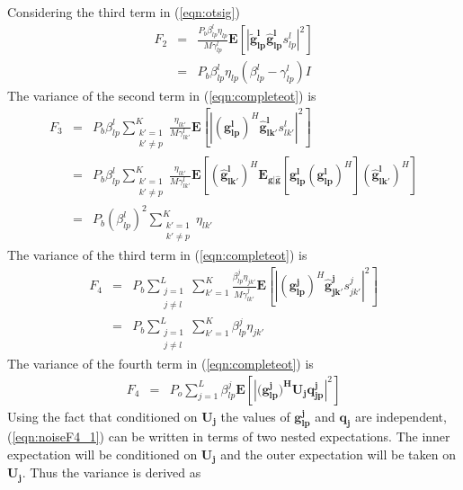 \documentclass[10pt, a4paper, twoside,fleqn]{article}
\begin{document}
Considering the third term in (\ref{eqn:otsig}) 
\begin{eqnarray}\label{eq:noiseF2}
	F_2 &=& \frac{P_b\beta_{lp}^{l}\eta_{lp}}{M\gamma_{lp}^{l}} \mathbf{E}[| \mathbf{\widetilde{g}_{lp}^{l}} \mathbf{\hat g_{lp}^{l}} s_{lp}^{l}|^2] \nonumber \\
	    &=&  P_b\beta_{lp}^{l}\eta_{lp} (\beta_{lp}^{l} - \gamma_{lp}^{l})I 
\end{eqnarray}
The variance of the second term in (\ref{eqn:completeot}) is
\begin{eqnarray}\label{eq:noiseF3}
	F_3 &=& P_b\beta_{lp}^{l}\sum_{\substack{k'=1 \\ k' \neq p}}^{K}\frac{\eta_{lk'}}{M\gamma_{lk'}^{l}} \mathbf{E}[|(\mathbf{g_{lp}^{l}})^H \mathbf{\hat g_{lk'}^{l}} s_{lk'}^{l}|^2] \nonumber \\
            &=& P_b\beta_{lp}^{l}\sum_{\substack{k'=1 \\ k' \neq p}}^{K}\frac{\eta_{lk'}}{M\gamma_{lk'}^{l}} \mathbf{E} \left[(\mathbf{\hat g_{lk'}^{l}})^H \mathbf{E_{g|\hat g}} \left[\mathbf{g_{lp}^{l}} (\mathbf{g_{lp}^{l}})^H \right] (\mathbf{\hat g_{lk'}^{l}})^H \right] \\ 
	    &=&  P_b(\beta_{lp}^{l})^2\sum_{\substack{k'=1 \\ k' \neq p}}^{K}\eta_{lk'} 
\end{eqnarray}
The variance of the third term in (\ref{eqn:completeot}) is
\begin{eqnarray}\label{eqn:noiseF4}
	F_4 &=& P_b\sum_{\substack{j=1 \\j \neq l}}^{L} \sum_{k'=1}^{K} \frac{\beta_{lp}^{j}\eta_{jk'}}{M\gamma_{lk'}^{j}} \mathbf{E}\left[ |(\mathbf{g_{lp}^{j}})^H \mathbf{\hat g_{jk'}^{j}} s_{jk'}^{j}|^2 \right] \nonumber \\
            &=&  P_b\sum_{\substack{j=1 \\j \neq l}}^{L} \sum_{k'=1}^{K} \beta_{lp}^{j}\eta_{jk'}
\end{eqnarray}
The variance of the fourth term in (\ref{eqn:completeot}) is
\begin{eqnarray}\label{eqn:noiseF4_1}
	F_4 &=& P_o\sum_{j=1}^{L}\beta_{lp}^{j}\mathbf{E}\left[|(\mathbf{g_{lp}^{j})^HU_jq_{jp}^{j}}|^2\right] \nonumber
\end{eqnarray}
Using the fact that conditioned on $\mathbf{U_j}$ the values of $\mathbf{g_{lp}^{j}}$ and $\mathbf{q_{j}}$ are independent, (\ref{eqn:noiseF4_1}) can be written in terms of two nested expectations. The inner expectation will be conditioned on $\mathbf{U_j}$ and the outer expectation will be taken on  $\mathbf{U_j}$. Thus the variance is derived as
\end{document}
